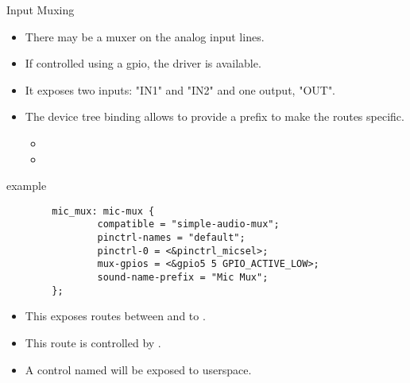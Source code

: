 \begin{frame}{Input Muxing}
  \begin{itemize}
  \item There may be a muxer on the analog input lines.
  \item If controlled using a gpio, the  driver is
    available.
  \item It exposes two inputs: "IN1" and "IN2" and one output, "OUT".
  \item The device tree binding allows to provide a prefix to make the
    routes specific.
    \begin{itemize}
      \item {}
      \item {}
    \end{itemize}
  \end{itemize}
\end{frame}

\begin{frame}[fragile]{ example}
  \begin{block}{}
    \fontsize{8}{8}\selectfont
    \begin{verbatim}
        mic_mux: mic-mux {
                compatible = "simple-audio-mux";
                pinctrl-names = "default";
                pinctrl-0 = <&pinctrl_micsel>;
                mux-gpios = <&gpio5 5 GPIO_ACTIVE_LOW>;
                sound-name-prefix = "Mic Mux";
        };
    \end{verbatim}
  \end{block}
  \begin{itemize}
  \item This exposes routes between  and  to .
  \item This route is controlled by .
  \item A control named  will be exposed to
    userspace.
  \end{itemize}
\end{frame}

